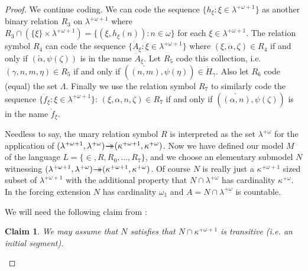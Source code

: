 \documentclass{amsart}
\theoremstyle{plain}
\theoremstyle{definition}
\theoremstyle{remark}
\theoremstyle{plain}
\newtheorem*{claim*}{Claim}
\theoremstyle{definition}
\theoremstyle{remark}
\begin{document}
\begin{proof}
            We continue coding. We can code the sequence
             $\{ h_\xi : \xi\in \lambda^{+\omega+1}\}$ as another binary  relation
             $R_3$ on $\lambda^{+\omega+1}$ where $R_3\cap \left(\{\xi\}\times
             \lambda^{+\omega+1}\right) = \{ (\xi,h_\xi(n) ) : n\in \omega\}$
            for each $\xi\in \lambda^{+\omega+1}$. The relation symbol $R_4$ can
            code the sequence $\{ \dot A_\xi : \xi \in \lambda^{+\omega+1}\}$
            where $(\xi, \alpha, \zeta) \in R_4$ if and only if
            $(\check \alpha, \psi(\zeta))$ is in the name $\dot A_\xi$.
             Let $R_5$ code this collection, i.e.
             $(\gamma,n,m,\eta)\in R_5$ if and only if
             $(\check{(n,m)}, \psi(\eta))\in \dot H_\gamma$. Also let $R_6$ code
             (equal)  the set $\Lambda$.
            Finally we use the relation symbol $R_7$ to similarly code the
            sequence $\{ \dot f_\xi  : \xi \in \lambda^{+\omega+1}\}$:
             $(\xi, \alpha, n, \zeta) \in R_7$ if and only if
            $(\check {(\alpha,n)}, \psi(\zeta))$ is in the name $\dot f_\xi$.

            Needless to say, the unary relation symbol $R$
            is interpreted as the set $\lambda^{+\omega}$ for the application of
            $(\lambda^{+\omega+1},\lambda^{+\omega})\rlap{$\rightarrow$}\,{\rightarrow}
            (\kappa^{+\omega+1},\kappa^{+\omega})$.
             Now  we have defined our model
            $M$  of the language $L= \{\in, R, R_0,\ldots, R_7\}$,
             and we choose an elementary submodel
            $N$ witnessing
            $(\lambda^{+\omega+1},\lambda^{+\omega})\rlap{$\rightarrow$}\,{\rightarrow}
            (\kappa^{+\omega+1},\kappa^{+\omega})$. Of course $N$ is really just
            a $\kappa^{+\omega+1}$ sized subset of $\lambda^{+\omega+1}$
            with the additional property that $N\cap \lambda^{+\omega}$ has
            cardinality $\kappa^{+\omega}$.  In the
            forcing extension $N$ has cardinality $\omega_1$ and
             $A= N\cap \lambda^{+\omega}$ is countable.

            We will need the following claim from \cite{MR1045371}:

            \begin{claim*} We may assume that $N$ satisfies that
             $N\cap \kappa^{+\omega+1}$ is transitive (i.e. an initial segment).
            \end{claim*}

            \bgroup
            \def\proofname{Proof of Claim:\/}


\end{proof}
\end{document}
